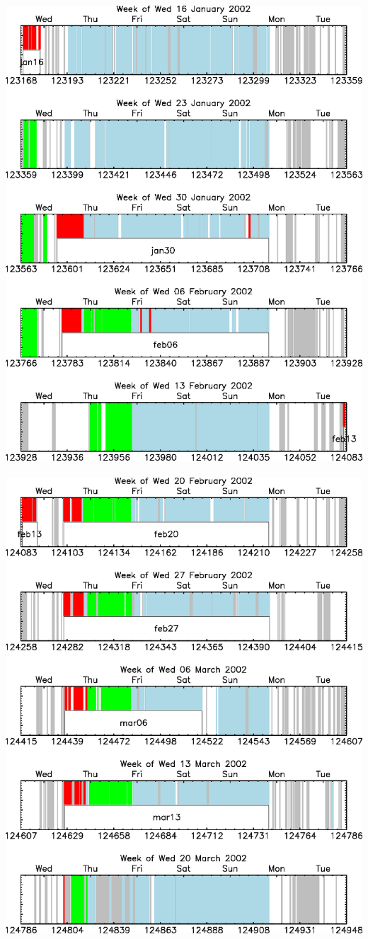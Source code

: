 \documentclass[12pt]{article}
\begin{document}
\mbox{ } \vfill \includegraphics[width=\linewidth]{fits2_dates03.eps} \vfill \mbox{ } \pagebreak
\mbox{ } \vfill \includegraphics[width=\linewidth]{fits2_dates04.eps} \vfill \mbox{ } \pagebreak
\end{document}
